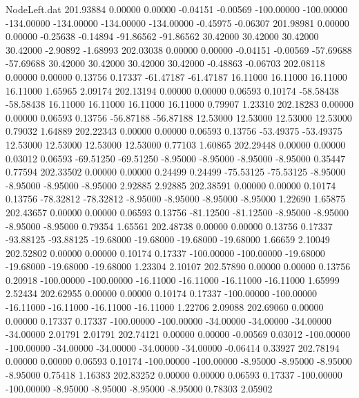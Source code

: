 \begin{filecontents}{NodeLeft.dat}
 201.93884    0.00000    0.00000    -0.04151   -0.00569 -100.00000 -100.00000 -134.00000 -134.00000 -134.00000 -134.00000   -0.45975   -0.06307
 201.98981    0.00000    0.00000    -0.25638   -0.14894  -91.86562  -91.86562   30.42000   30.42000   30.42000   30.42000   -2.90892   -1.68993
 202.03038    0.00000    0.00000    -0.04151   -0.00569  -57.69688  -57.69688   30.42000   30.42000   30.42000   30.42000   -0.48863   -0.06703
 202.08118    0.00000    0.00000     0.13756    0.17337  -61.47187  -61.47187   16.11000   16.11000   16.11000   16.11000    1.65965    2.09174
 202.13194    0.00000    0.00000     0.06593    0.10174  -58.58438  -58.58438   16.11000   16.11000   16.11000   16.11000    0.79907    1.23310
 202.18283    0.00000    0.00000     0.06593    0.13756  -56.87188  -56.87188   12.53000   12.53000   12.53000   12.53000    0.79032    1.64889
 202.22343    0.00000    0.00000     0.06593    0.13756  -53.49375  -53.49375   12.53000   12.53000   12.53000   12.53000    0.77103    1.60865
 202.29448    0.00000    0.00000     0.03012    0.06593  -69.51250  -69.51250   -8.95000   -8.95000   -8.95000   -8.95000    0.35447    0.77594
 202.33502    0.00000    0.00000     0.24499    0.24499  -75.53125  -75.53125   -8.95000   -8.95000   -8.95000   -8.95000    2.92885    2.92885
 202.38591    0.00000    0.00000     0.10174    0.13756  -78.32812  -78.32812   -8.95000   -8.95000   -8.95000   -8.95000    1.22690    1.65875
 202.43657    0.00000    0.00000     0.06593    0.13756  -81.12500  -81.12500   -8.95000   -8.95000   -8.95000   -8.95000    0.79354    1.65561
 202.48738    0.00000    0.00000     0.13756    0.17337  -93.88125  -93.88125  -19.68000  -19.68000  -19.68000  -19.68000    1.66659    2.10049
 202.52802    0.00000    0.00000     0.10174    0.17337 -100.00000 -100.00000  -19.68000  -19.68000  -19.68000  -19.68000    1.23304    2.10107
 202.57890    0.00000    0.00000     0.13756    0.20918 -100.00000 -100.00000  -16.11000  -16.11000  -16.11000  -16.11000    1.65999    2.52434
 202.62955    0.00000    0.00000     0.10174    0.17337 -100.00000 -100.00000  -16.11000  -16.11000  -16.11000  -16.11000    1.22706    2.09088
 202.69060    0.00000    0.00000     0.17337    0.17337 -100.00000 -100.00000  -34.00000  -34.00000  -34.00000  -34.00000    2.01791    2.01791
 202.74121    0.00000    0.00000    -0.00569    0.03012 -100.00000 -100.00000  -34.00000  -34.00000  -34.00000  -34.00000   -0.06414    0.33927
 202.78194    0.00000    0.00000     0.06593    0.10174 -100.00000 -100.00000   -8.95000   -8.95000   -8.95000   -8.95000    0.75418    1.16383
 202.83252    0.00000    0.00000     0.06593    0.17337 -100.00000 -100.00000   -8.95000   -8.95000   -8.95000   -8.95000    0.78303    2.05902

\end{filecontents}
